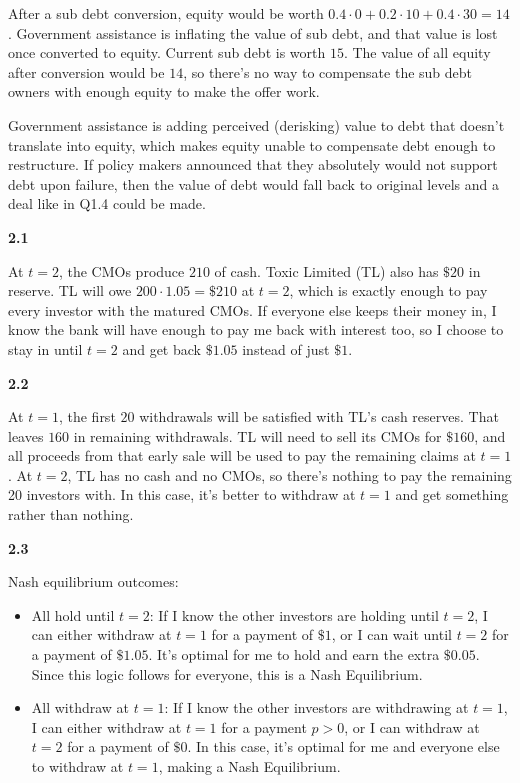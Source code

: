 \documentclass[11pt]{article}
\begin{document}
After a sub debt conversion, equity would be worth $0.4 \cdot 0 + 0.2 \cdot 10 + 0.4 \cdot 30 = 14$. Government assistance is inflating the value of sub debt, and that value is lost once converted to equity. Current sub debt is worth $15$. The value of all equity after conversion would be $14$, so there's no way to compensate the sub debt owners with enough equity to make the offer work.

Government assistance is adding perceived (derisking) value to debt that doesn't translate into equity, which makes equity unable to compensate debt enough to restructure. If policy makers announced that they absolutely would not support debt upon failure, then the value of debt would fall back to original levels and a deal like in Q1.4 could be made. 

\newpage

\textbf{2.1}

At $t = 2$, the CMOs produce $210$ of cash. Toxic Limited (TL) also has $\$20$ in reserve. TL will owe $200 \cdot 1.05 = \$210$ at $t = 2$, which is exactly enough to pay every investor with the matured CMOs. If everyone else keeps their money in, I know the bank will have enough to pay me back with interest too, so I choose to stay in until $t = 2$ and get back $\$1.05$ instead of just $\$1$. 

\textbf{2.2}

At $t = 1$, the first $20$ withdrawals will be satisfied with TL's cash reserves. That leaves $160$ in remaining withdrawals. TL will need to sell its CMOs for $\$160$, and all proceeds from that early sale will be used to pay the remaining claims at $t = 1$. At $t = 2$, TL has no cash and no CMOs, so there's nothing to pay the remaining 20 investors with. In this case, it's better to withdraw at $t = 1$ and get something rather than nothing.

\textbf{2.3}

Nash equilibrium outcomes:
\begin{itemize}
  \item All hold until $t = 2$: If I know the other investors are holding until $t = 2$, I can either withdraw at $t = 1$ for a payment of $\$1$, or I can wait until $t = 2$ for a payment of $\$1.05$. It's optimal for me to hold and earn the extra $\$0.05$. Since this logic follows for everyone, this is a Nash Equilibrium.
  \item All withdraw at $t = 1$: If I know the other investors are withdrawing at $t = 1$, I can either withdraw at $t = 1$ for a payment $p \gt 0$, or I can withdraw at $t = 2$ for a payment of $\$0$. In this case, it's optimal for me and everyone else to withdraw at $t = 1$, making a Nash Equilibrium. 
\end{itemize}
\end{document}
